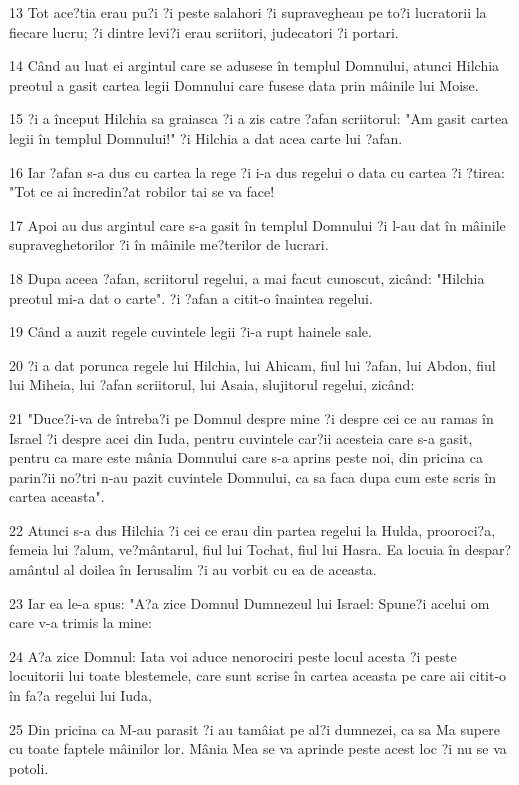 \par 13 Tot ace?tia erau pu?i ?i peste salahori ?i supravegheau pe to?i lucratorii la fiecare lucru; ?i dintre levi?i erau scriitori, judecatori ?i portari.
\par 14 Când au luat ei argintul care se adusese în templul Domnului, atunci Hilchia preotul a gasit cartea legii Domnului care fusese data prin mâinile lui Moise.
\par 15 ?i a început Hilchia sa graiasca ?i a zis catre ?afan scriitorul: "Am gasit cartea legii în templul Domnului!" ?i Hilchia a dat acea carte lui ?afan.
\par 16 Iar ?afan s-a dus cu cartea la rege ?i i-a dus regelui o data cu cartea ?i ?tirea: "Tot ce ai încredin?at robilor tai se va face!
\par 17 Apoi au dus argintul care s-a gasit în templul Domnului ?i l-au dat în mâinile supraveghetorilor ?i în mâinile me?terilor de lucrari.
\par 18 Dupa aceea ?afan, scriitorul regelui, a mai facut cunoscut, zicând: "Hilchia preotul mi-a dat o carte". ?i ?afan a citit-o înaintea regelui.
\par 19 Când a auzit regele cuvintele legii ?i-a rupt hainele sale.
\par 20 ?i a dat porunca regele lui Hilchia, lui Ahicam, fiul lui ?afan, lui Abdon, fiul lui Miheia, lui ?afan scriitorul, lui Asaia, slujitorul regelui, zicând:
\par 21 "Duce?i-va de întreba?i pe Domnul despre mine ?i despre cei ce au ramas în Israel ?i despre acei din Iuda, pentru cuvintele car?ii acesteia care s-a gasit, pentru ca mare este mânia Domnului care s-a aprins peste noi, din pricina ca parin?ii no?tri n-au pazit cuvintele Domnului, ca sa faca dupa cum este scris în cartea aceasta".
\par 22 Atunci s-a dus Hilchia ?i cei ce erau din partea regelui la Hulda, prooroci?a, femeia lui ?alum, ve?mântarul, fiul lui Tochat, fiul lui Hasra. Ea locuia în despar?amântul al doilea în Ierusalim ?i au vorbit cu ea de aceasta.
\par 23 Iar ea le-a spus: "A?a zice Domnul Dumnezeul lui Israel: Spune?i acelui om care v-a trimis la mine:
\par 24 A?a zice Domnul: Iata voi aduce nenorociri peste locul acesta ?i peste locuitorii lui toate blestemele, care sunt scrise în cartea aceasta pe care aii citit-o în fa?a regelui lui Iuda,
\par 25 Din pricina ca M-au parasit ?i au tamâiat pe al?i dumnezei, ca sa Ma supere cu toate faptele mâinilor lor. Mânia Mea se va aprinde peste acest loc ?i nu se va potoli.
